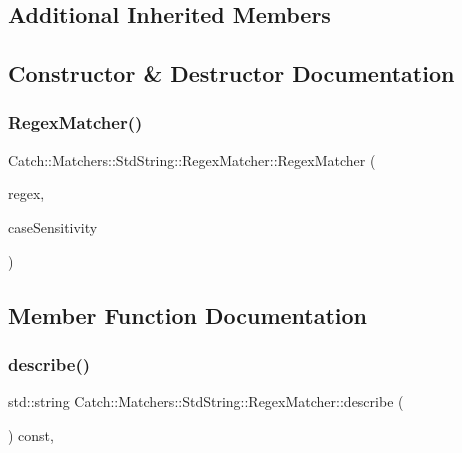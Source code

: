 \subsection*{Additional Inherited Members}


\subsection{Constructor \& Destructor Documentation}
\mbox{\label{struct_catch_1_1_matchers_1_1_std_string_1_1_regex_matcher_ab914deb885fe25558c41ab368c6b3916}} 
\subsubsection{\texorpdfstring{RegexMatcher()}{RegexMatcher()}}
{\footnotesize\ttfamily Catch\+::\+Matchers\+::\+Std\+String\+::\+Regex\+Matcher\+::\+Regex\+Matcher (\begin{DoxyParamCaption}\item[{std\+::string}]{regex,  }\item[{\mbox{\hyperlink{struct_catch_1_1_case_sensitive_aad49d3aee2d97066642fffa919685c6a}{Case\+Sensitive\+::\+Choice}}}]{case\+Sensitivity }\end{DoxyParamCaption})}



\subsection{Member Function Documentation}
\mbox{\label{struct_catch_1_1_matchers_1_1_std_string_1_1_regex_matcher_a1f788cd5258c987e5043f6c7f43adeb9}} 
\subsubsection{\texorpdfstring{describe()}{describe()}}
{\footnotesize\ttfamily std\+::string Catch\+::\+Matchers\+::\+Std\+String\+::\+Regex\+Matcher\+::describe (\begin{DoxyParamCaption}{ }\end{DoxyParamCaption}) const\hspace{0.3cm}{\ttfamily [override]}, {\ttfamily [virtual]}}



